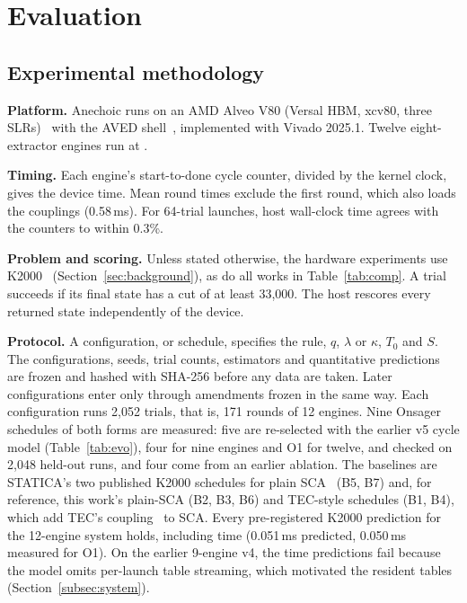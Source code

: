 \section{Evaluation}\label{sec:evaluation}

\subsection{Experimental methodology}\label{subsec:setup}
\textbf{Platform.} Anechoic runs on an AMD Alveo V80 (Versal HBM, xcv80, three SLRs)~\cite{amd_v80} with the AVED shell~\cite{amd_aved}, implemented with Vivado 2025.1. Twelve eight-extractor engines run at \fClk{}.

\noindent\textbf{Timing.} Each engine's start-to-done cycle counter, divided by the kernel clock, gives the device time. Mean round times exclude the first round, which also loads the couplings (0.58\,ms). For 64-trial launches, host wall-clock time agrees with the counters to within 0.3\%.

\noindent\textbf{Problem and scoring.} Unless stated otherwise, the hardware experiments use K2000~\cite{doi:10.1126/science.aah4243} (Section~\ref{sec:background}), as do all works in Table~\ref{tab:comp}. A trial succeeds if its final state has a cut of at least 33{,}000. The host rescores every returned state independently of the device.

\noindent\textbf{Protocol.} A configuration, or schedule, specifies the rule, $q$, $\lambda$ or $\kappa$, $T_0$ and $S$. The configurations, seeds, trial counts, estimators and quantitative predictions are frozen and hashed with SHA-256 before any data are taken. Later configurations enter only through amendments frozen in the same way. Each configuration runs 2{,}052 trials, that is, 171 rounds of 12 engines. Nine Onsager schedules of both forms are measured: five are re-selected with the earlier v5 cycle model (Table~\ref{tab:evo}), four for nine engines and O1 for twelve, and checked on 2{,}048 held-out runs, and four come from an earlier ablation. The baselines are STATICA's two published K2000 schedules for plain SCA~\cite{yamamoto2021statica} (B5, B7) and, for reference, this work's plain-SCA (B2, B3, B6) and TEC-style schedules (B1, B4), which add TEC's coupling~\cite{du2026tec} to SCA.
Every pre-registered K2000 prediction for the 12-engine system holds, including time (0.051\,ms predicted, 0.050\,ms measured for O1). On the earlier 9-engine v4, the time predictions fail because the model omits per-launch table streaming, which motivated the resident tables (Section~\ref{subsec:system}).


